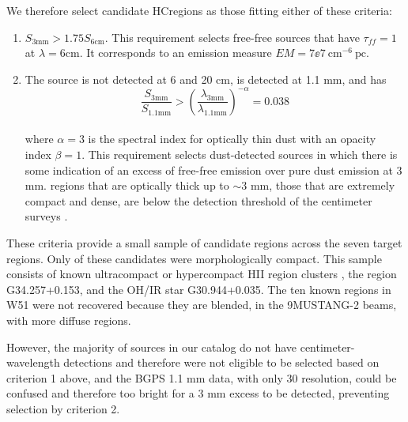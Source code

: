\documentclass[twocolumn]{aastex62}
\newcommand{\MUSTANG}{MUSTANG-2\xspace}
\begin{document}
We therefore select candidate HC\hii regions
as those fitting either of these criteria:
\begin{enumerate}
    \item $S_{3 \mathrm{mm}} > 1.75 S_{6 \mathrm{cm}}$.  %
        This requirement selects free-free sources that have $\tau_{ff}=1$
        at $\lambda = {6 \mathrm{cm}}$.  It corresponds to an emission
        measure ${EM=7\ee{7}~\mathrm{cm}^{-6}~\mathrm{pc}}$.
    \item
        The source is not detected at 6 and 20 cm, is detected at 1.1 mm, and has
        \begin{equation}
            \frac{S_{3 \mathrm{mm}}}{S_{1.1 \mathrm{mm}}} > \left(\frac{\lambda_{3 \mathrm{mm}}}
            {\lambda_{1.1 \mathrm{mm}}}\right)^{-\alpha} = 0.038
        \end{equation}\\
        where $\alpha=3$ is the spectral
        index for optically thin dust with an opacity index $\beta=1$.  This
        requirement selects dust-detected sources in which there is some
        indication of an excess of free-free emission over pure dust emission
        at 3 mm.
        \hchii regions that are optically
        thick up to $\sim3$ mm, those that are extremely compact and dense,
        are below the detection threshold of the centimeter surveys
        \citep[$\approx2.5$ mJy at 6 cm;][]{Giveon2005a,Hoare2012a}.
\end{enumerate}

These criteria provide a small sample of \nhiicand candidate \hchii regions
across the seven target regions.  Only \ncompacthiicand of these candidates
were morphologically compact. This sample consists of known
ultracompact or hypercompact HII region clusters \citep[three are parts of W49A, which contains
12 sources that can be classified as \hchii regions][]{De-Pree1997a},
the \hchii region G34.257+0.153, and the OH/IR star G30.944+0.035.
The ten known \hchii regions in W51 \citep{Ginsburg2016b} were not recovered because
they are blended, in the 9\arcsec \MUSTANG beams, with more diffuse \hii regions.

However, the majority of sources in our catalog do not have
centimeter-wavelength detections and therefore were not
eligible to be selected based on criterion 1 above, and the BGPS 1.1 mm data,
with only 30 \arcsec resolution, could be confused and therefore too bright for
a 3 mm excess to be detected, preventing selection by criterion 2. 
\end{document}

